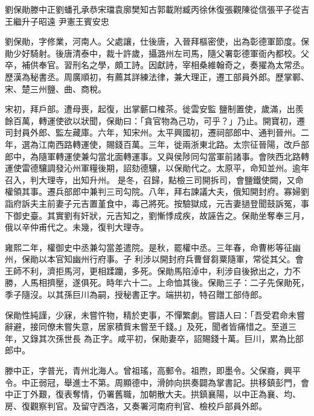 
\begin{pinyinscope}

 劉保勛滕中正劉蟠孔承恭宋璫袁廓樊知古郭載附臧丙徐休復張觀陳從信張平子從吉王繼升子昭遠
 尹憲王賓安忠



 劉保勛，字修業，河南人。父處讓，仕後唐，入晉拜樞密使，出為彰德軍節度。保勛少好騎射。後唐清泰中，裁十許歲，攝潞州左司馬，隨父署彰德軍衙內都校。父卒，補供奉官。習刑名之學，頗工詩。因獻詩，宰相桑維翰奇之，奏擢為太常丞。歷漢為秘書丞。周廣順初，有薦其詳練法律，兼大理正，遷工部員外郎。歷掌鄆、宋、楚三州鹽、曲、商稅。



 宋初，拜戶部。遭母喪，起復，出掌蘄口榷茶。徙雲安監
 鹽制置使，歲滿，出羨餘百萬，轉運使欲以狀聞，保勛曰：「貪官物為己功，可乎？」乃止。開寶初，遷司封員外郎、監左藏庫。六年，知宋州。太平興國初，遷祠部郎中、通判晉州。二年，選為江南西路轉運使，賜錢百萬。三年，徙兩浙東北路。太宗征晉陽，改戶部郎中，為隨軍轉運使兼勾當北面轉運事。又與侯陟同勾當軍前諸事。會陜西北路轉運使雷德驤調發沁州軍糧後期，詔劾德驤，以保勛代之。太原平，命知並州。逾年召入，判大理寺，出知升州。
 是冬，召歸，點檢三司開拆司，會鹽鐵使闕，又命權領其事。遷兵部郎中兼判三司勾院。八年，拜右諫議大夫，俄知開封府。寡婦劉詣府訴夫主前妻子元吉置堇食中，毒己將死。按驗獄成，元吉妻撾登聞鼓訴冤，事下御史臺。其實劉有奸狀，元吉知之，劉慚悸成疾，故誣告之。保勛坐奪奉三月，俄以辛仲甫代之。未幾，復判大理寺。



 雍熙二年，權御史中丞兼勾當差遣院。是秋，罷權中丞。三年春，命曹彬等征幽州，保勛以本官知幽州行府事。子
 利涉以開封府兵曹督芻粟隨軍，常從其父。會王師不利，濟拒馬河，更相蹂躪，多死。保勛馬陷淖中，利涉自後掀出之，力不勝，人馬相擠壓，遂俱死。時年六十二。上命恤其後。保勛三子：二子先保勛死，季子隨沒。以其孫巨川為嗣，授秘書正字。端拱初，特召贈工部侍郎。



 保勛性純謹，少寐，未嘗忤物，精於吏事，不憚繁劇。嘗語人曰：「吾受君命未嘗辭避，接同僚未嘗失意，居家積貲未嘗至千錢。」及死，聞者皆痛惜之。至道三年，又錄其次孫世長
 為正字。咸平初，保勛妻卒，詔賜錢十萬。巨川，累為比部郎中。



 滕中正，字普光，青州北海人。曾祖瑤，高郵令。祖煦，即墨令。父保裔，興平令。中正弱冠，舉進士不第。周顯德中，滑帥向拱奏闢為掌書記。拱移鎮彭門，會中正丁外艱，復表奪情，仍署舊職，加朝散大夫。拱鎮襄陽，以中正為襄、均、房、復觀察判官。及留守西洛，又奏署河南府判官、檢校戶部員外郎。




\end{pinyinscope}
